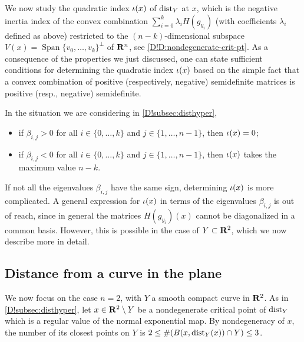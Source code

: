 We now study the quadratic index $\iota(x)$ of $\operatorname{dist}_Y$ at $x$, which is the negative inertia index of the convex combination $\sum_{i=0}^k \lambda_i H(g_{y_i})$ (with coefficients $\lambda_i$ defined as above) restricted to the $(n-k)$-dimensional subspace $V(x)= \operatorname{Span}\{v_0,\ldots ,v_k\}^{\perp}$ of $\mathbf{R}^n$, see \cref{D!D:nondegenerate-crit-pt}. 
As a consequence of the properties we just discussed, one can state sufficient conditions for determining the quadratic index $\iota (x)$ based on the simple fact that a convex combination of positive (respectively, negative) semidefinite matrices is positive (resp., negative) semidefinite.

\begin{corollary}\label{D!coro:quadi}
  In the situation we are considering in \cref{D!subsec:disthyper},
  \begin{itemize}
    \item[-] if $\beta_{i,j}>0$ for all $i\in \{0,\ldots ,k\}$ and $j\in \{1,\ldots ,n-1\}$, then $\iota(x)=0$; 
    \item[-] if $\beta_{i,j}<0$ for all $i\in \{0,\ldots ,k\}$ and $j\in \{1,\ldots ,n-1\}$, then $\iota(x)$ takes the maximum value $n-k$.
  \end{itemize}
\end{corollary}

If not all the eigenvalues $\beta_{i,j}$ have the same sign, determining $\iota (x)$ is more complicated. A general expression for $\iota (x)$ in terms of the eigenvalues $\beta_{i,j}$ is out of reach, since in general the matrices $H(g_{y_i})(x)$ cannot be diagonalized in a common basis. However, this is possible in the case of $Y\subset \mathbf{R}^2$, which we now describe more in detail.

\subsection{Distance from a curve in the plane}

We now focus on the case $n=2$, with $Y$ a smooth compact curve in $\mathbf{R}^2$.
As in \cref{D!subsec:disthyper}, let $x \in \mathbf{R}^2 \setminus Y$ be a nondegenerate critical point of $\operatorname{dist}_Y$ which is a regular value of the normal exponential map. By nondegeneracy of $x$, the number of its closest points on $Y$ is $2\le \# (B(x,\operatorname{dist}_Y(x))\cap Y) \le 3$.


